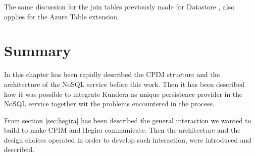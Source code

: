 \noindent The same discussion for the join tables previously made for Datastore , also applies for the Azure Table extension.

\section{Summary}
In this chapter has been rapidly described the CPIM structure and the architecture of the NoSQL service before this work. Then it has been described how it was possible to integrate Kundera as unique persistence provider in the NoSQL service together wit the problems encountered in the process.

\noindent From section \ref{sec:hegira} has been described the general interaction we wanted to build to make CPIM and Hegira communicate. Then the architecture and the design choices operated in order to develop such interaction, were introduced and described.
